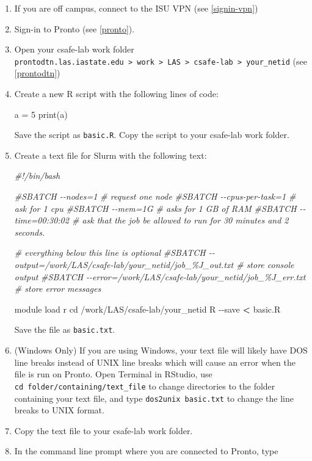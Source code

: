 \documentclass[
]{book}
\newenvironment{Shaded}{\begin{snugshade}}{\end{snugshade}}
\newcommand{\AttributeTok}[1]{\textcolor[rgb]{0.77,0.63,0.00}{#1}}
\newcommand{\BuiltInTok}[1]{#1}
\newcommand{\CommentTok}[1]{\textcolor[rgb]{0.56,0.35,0.01}{\textit{#1}}}
\newcommand{\DecValTok}[1]{\textcolor[rgb]{0.00,0.00,0.81}{#1}}
\newcommand{\ExtensionTok}[1]{#1}
\newcommand{\FunctionTok}[1]{\textcolor[rgb]{0.00,0.00,0.00}{#1}}
\newcommand{\NormalTok}[1]{#1}
\newcommand{\OperatorTok}[1]{\textcolor[rgb]{0.81,0.36,0.00}{\textbf{#1}}}
\newcommand{\OtherTok}[1]{\textcolor[rgb]{0.56,0.35,0.01}{#1}}
\begin{document}
\begin{enumerate}
\def\labelenumi{\arabic{enumi}.}
\item
  If you are off campus, connect to the ISU VPN (see \ref{signin-vpn})
\item
  Sign-in to Pronto (see \ref{pronto}).
\item
  Open your csafe-lab work folder \texttt{prontodtn.las.iastate.edu\ \textgreater{}\ work\ \textgreater{}\ LAS\ \textgreater{}\ csafe-lab\ \textgreater{}\ your\_netid} (see \ref{prontodtn})
\item
  Create a new R script with the following lines of code:

\begin{Shaded}
\begin{Highlighting}[]
\NormalTok{a }\OtherTok{=} \DecValTok{5}
\FunctionTok{print}\NormalTok{(a)}
\end{Highlighting}
\end{Shaded}

  Save the script as \texttt{basic.R}. Copy the script to your csafe-lab work folder.
\item
  Create a text file for Slurm with the following text:

\begin{Shaded}
\begin{Highlighting}[]
\CommentTok{\#!/bin/bash}

\CommentTok{\#SBATCH {-}{-}nodes=1 \# request one node}
\CommentTok{\#SBATCH {-}{-}cpus{-}per{-}task=1  \# ask for 1 cpu}
\CommentTok{\#SBATCH {-}{-}mem=1G \#  asks for 1 GB of RAM}
\CommentTok{\#SBATCH {-}{-}time=00:30:02 \# ask that the job be allowed to run for 30 minutes and 2 seconds.}

\CommentTok{\# everything below this line is optional}
\CommentTok{\#SBATCH {-}{-}output=/work/LAS/csafe{-}lab/your\_netid/job\_\%J\_out.txt \# store console output}
\CommentTok{\#SBATCH {-}{-}error=/work/LAS/csafe{-}lab/your\_netid/job\_\%J\_err.txt \# store error messages}

\ExtensionTok{module}\NormalTok{ load r}
\BuiltInTok{cd}\NormalTok{ /work/LAS/csafe{-}lab/your\_netid}
\ExtensionTok{R} \AttributeTok{{-}{-}save} \OperatorTok{\textless{}}\NormalTok{ basic.R}
\end{Highlighting}
\end{Shaded}

  Save the file as \texttt{basic.txt}.
\item
  (Windows Only) If you are using Windows, your text file will likely have DOS line breaks instead of UNIX line breaks which will cause an error when the file is run on Pronto. Open Terminal in RStudio, use \texttt{cd\ folder/containing/text\_file} to change directories to the folder containing your text file, and type \texttt{dos2unix\ basic.txt} to change the line breaks to UNIX format.
\item
  Copy the text file to your csafe-lab work folder.
\item
  In the command line prompt where you are connected to Pronto, type


\end{enumerate}
\end{document}
